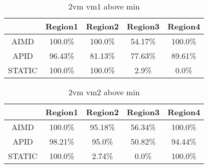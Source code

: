 \begin{table}[]
\centering
\caption{2vm vm1 above min}
\label{my-label}
\begin{tabular}{|c|c|c|c|c|}
\hline
\multicolumn{1}{|l|}{} & Region1 & Region2 & Region3 & Region4 \\ \hline
AIMD& 100.0\% & 100.0\% & 54.17\% & 100.0\%  \\ \hline
APID& 96.43\% & 81.13\% & 77.63\% & 89.61\%  \\ \hline
STATIC& 100.0\% & 100.0\% & 2.9\% & 0.0\%  \\ \hline

\end{tabular}
\end{table}

\begin{table}[]
\centering
\caption{2vm vm2 above min}
\label{my-label}
\begin{tabular}{|c|c|c|c|c|}
\hline
\multicolumn{1}{|l|}{} & Region1 & Region2 & Region3 & Region4 \\ \hline
AIMD& 100.0\% & 95.18\% & 56.34\% & 100.0\%  \\ \hline
APID& 98.21\% & 95.0\% & 50.82\% & 94.44\%  \\ \hline
STATIC& 100.0\% & 2.74\% & 0.0\% & 100.0\%  \\ \hline

\end{tabular}
\end{table}